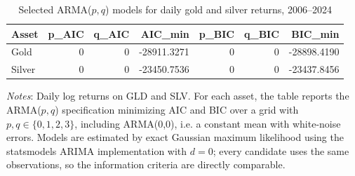 \begin{table}[H]
\centering
\caption{Selected ARMA($p,q$) models for daily gold and silver returns, 2006--2024}
\label{tab:arma-selection}
\begin{tabular}{lrrrrrr}
\toprule
Asset & p_AIC & q_AIC & AIC_min & p_BIC & q_BIC & BIC_min \\
\midrule
Gold & 0 & 0 & -28911.3271 & 0 & 0 & -28898.4190 \\
Silver & 0 & 0 & -23450.7536 & 0 & 0 & -23437.8456 \\
\bottomrule
\end{tabular}

\vspace{0.2cm}
\begin{minipage}{0.9\textwidth}
\footnotesize
\textit{Notes}: Daily log returns on GLD and SLV. For each asset, the table reports the ARMA($p,q$) specification minimizing AIC and BIC over a grid with $p,q \in \{0,1,2,3\}$, including ARMA(0,0), i.e. a constant mean with white-noise errors. Models are estimated by exact Gaussian maximum likelihood using the statsmodels ARIMA implementation with $d=0$; every candidate uses the same observations, so the information criteria are directly comparable.
\end{minipage}
\end{table}

